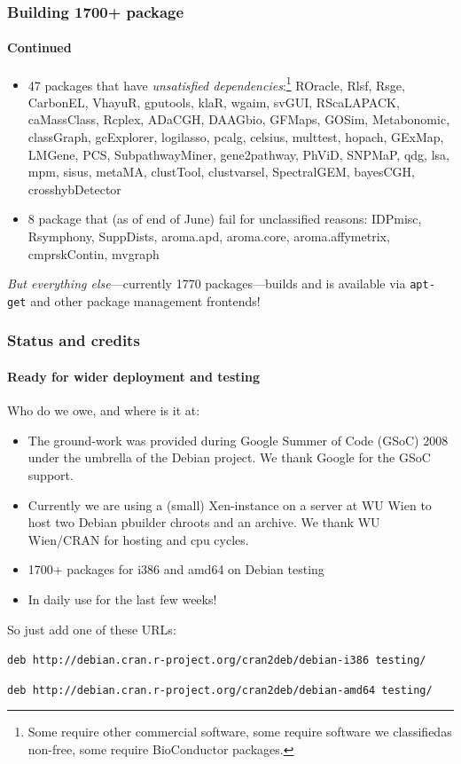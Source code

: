 \documentclass[smaller,compress]{beamer}
\begin{document}
\begin{frame}
  \frametitle{Building 1700+ package}
  \framesubtitle{Continued}

  \begin{itemize}
  \item 47 packages that have \textsl{unsatisfied
      dependencies}:\footnote{Some require other commercial software, some
      require software we classified\newline as non-free, some require BioConductor packages.}
    ROracle, Rlsf, Rsge, CarbonEL, VhayuR, gputools, klaR, wgaim, svGUI,
    RScaLAPACK, caMassClass, Rcplex, ADaCGH, DAAGbio, GFMaps, GOSim,
    Metabonomic, classGraph, gcExplorer, logilasso, pcalg, celsius, multtest,
    hopach, GExMap, LMGene, PCS, SubpathwayMiner, gene2pathway, PhViD,
    SNPMaP, qdg, lsa, mpm, sisus, metaMA, clustTool, clustvarsel,
    SpectralGEM, bayesCGH, crosshybDetector  
  \item 8 package that (as of end of June) fail for unclassified reasons:
    IDPmisc, Rsymphony, SuppDists, aroma.apd, aroma.core, aroma.affymetrix, cmprskContin, mvgraph
  \end{itemize}

  \MedSkip
  \textsl{But everything else}---currently 1770 packages---builds and is
  available via \texttt{apt-get} and other package management frontends!
\end{frame}  

\begin{frame}
  \frametitle{Status and credits}
  \framesubtitle{Ready for wider deployment and testing}

  Who do we owe, and where is it at: 

  \begin{itemize}
  \item The ground-work was provided during Google Summer of Code (GSoC) 2008 under the
    umbrella of the Debian project. We thank Google for the GSoC support.
  \item Currently we are using a (small) Xen-instance on a server at WU Wien to host
    two Debian pbuilder chroots and an archive. We thank WU Wien/CRAN for
    hosting and cpu cycles.
  \item 1700+ packages for i386 and amd64 on Debian testing
  \item In daily use for the last few weeks!
  \end{itemize}

  \MedSkip
  So just add one of these URLs:\newline
  { \scriptsize

    \texttt{deb http://debian.cran.r-project.org/cran2deb/debian-i386 testing/}

    \texttt{deb http://debian.cran.r-project.org/cran2deb/debian-amd64 testing/}
  }
\end{frame}
\end{document}
